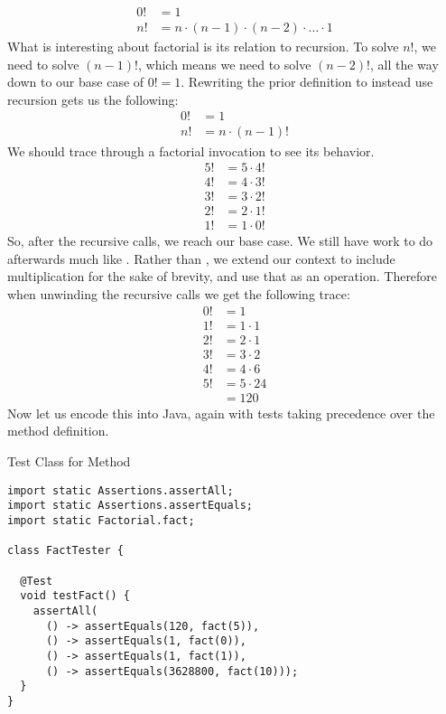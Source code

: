 \begin{align*}
    0! &= 1\\
    n! &= n \cdot (n - 1) \cdot (n - 2) \cdot \ldots \cdot 1
\end{align*}
What is interesting about factorial is its relation to recursion. To solve $n!$, we need to solve $(n-1)!$, which means we need to solve $(n-2)!$, all the way down to our base case of $0!=1$. Rewriting the prior definition to instead use recursion gets us the following: 
\begin{align*}
    0! &= 1\\
    n! &= n \cdot (n - 1)!
\end{align*}
We should trace through a factorial invocation to see its behavior.
\begin{align*}
    5! &= 5 \cdot 4!\\
    4! &= 4 \cdot 3!\\
    3! &= 3 \cdot 2!\\
    2! &= 2 \cdot 1!\\
    1! &= 1 \cdot 0!
\end{align*}
So, after the recursive calls, we reach our base case. We still have work to do afterwards much like . Rather than , we extend our context to include multiplication for the sake of brevity, and use that as an operation. Therefore when unwinding the recursive calls we get the following trace:
\begin{align*}
0! &= 1\\
1! &= 1 \cdot 1\\
2! &= 2 \cdot 1\\
3! &= 3 \cdot 2\\
4! &= 4 \cdot 6\\
5! &= 5 \cdot 24\\
   &= 120
\end{align*}
Now let us encode this into Java, again with tests taking precedence over the method definition.
\begin{cl}[]{Test Class for  Method}
\begin{lstlisting}[language=MyJava]
import static Assertions.assertAll;
import static Assertions.assertEquals;
import static Factorial.fact;

class FactTester {
  
  @Test
  void testFact() {
    assertAll(
      () -> assertEquals(120, fact(5)),
      () -> assertEquals(1, fact(0)),
      () -> assertEquals(1, fact(1)),
      () -> assertEquals(3628800, fact(10)));
  }
}
\end{lstlisting}
\end{cl}
